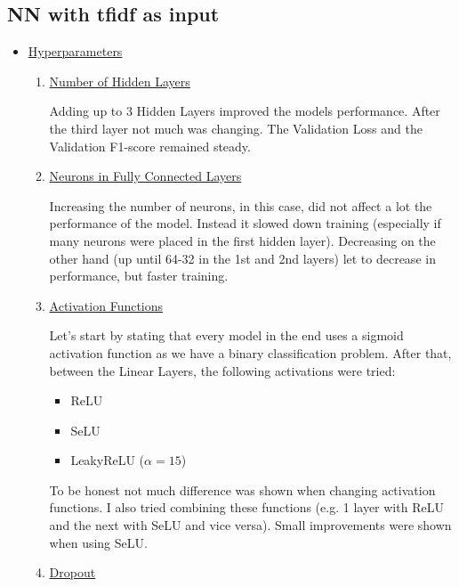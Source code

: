 \documentclass[12pt]{report}
\begin{document}
\subsection*{NN with tfidf as input}
\begin{itemize}
    \item \underline{Hyperparameters}
        \smallskip

\begin{enumerate}

    \item \underline{Number of Hidden Layers}
        \smallskip

        Adding up to 3 Hidden Layers improved the models performance. After the
        third layer not much was changing. The Validation Loss and the Validation
        F1-score remained steady.

    \item \underline{Neurons in Fully Connected Layers}
        \smallskip

        Increasing the number of neurons, in this case, did not affect a lot the performance
        of the model. Instead it slowed down training (especially if many neurons were placed
        in the first hidden layer). Decreasing on the other hand (up until 64-32 in the 1st and
        2nd layers) let to decrease in performance, but faster training.
    \item \underline{Activation Functions}
        \smallskip

        Let's start by stating that every model in the end uses a sigmoid activation
        function as we have a binary classification problem. After that, between the
        Linear Layers, the following activations were tried:
        \begin{itemize}
            \item ReLU
            \item SeLU
            \item LeakyReLU ($\alpha=15$)
        \end{itemize}
        To be honest not much difference was shown when changing activation functions.
        I also tried combining these functions (e.g. 1 layer with ReLU and the next with
        SeLU and vice versa). Small improvements were shown when using SeLU.
    \item \underline{Dropout}
        \smallskip


\end{enumerate}
\end{itemize}
\end{document}
